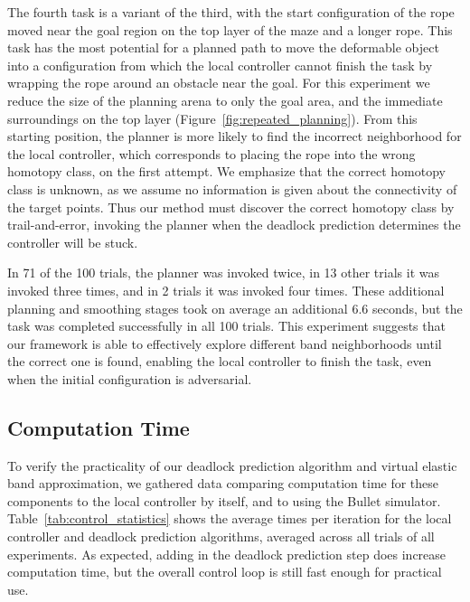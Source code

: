 The fourth task is a variant of the third, with the start configuration of the rope moved near the goal region on the top layer of the maze and a longer rope. This task has the most potential for a planned path to move the deformable object into a configuration from which the local controller cannot finish the task by wrapping the rope around an obstacle near the goal. For this experiment we reduce the size of the planning arena to only the goal area, and the immediate surroundings on the top layer (Figure~\ref{fig:repeated_planning}). From this starting position, the planner is more likely to find the incorrect neighborhood for the local controller, which corresponds to placing the rope into the wrong homotopy class, on the first attempt. We emphasize that the correct homotopy class is unknown, as we assume no information is given about the connectivity of the target points. Thus our method must discover the correct homotopy class by trail-and-error, invoking the planner when the deadlock prediction determines the controller will be stuck.

In 71 of the 100 trials, the planner was invoked twice, in 13 other trials it was invoked three times, and in 2 trials it was invoked four times. These additional planning and smoothing stages took on average an additional 6.6 seconds, but the task was completed successfully in all 100 trials. This experiment suggests that our framework is able to effectively explore different band neighborhoods until the correct one is found, enabling the local controller to finish the task, even when the initial configuration is adversarial.




\subsection{Computation Time}

To verify the practicality of our deadlock prediction algorithm and virtual elastic band approximation, we gathered data comparing computation time for these components to the local controller by itself, and to using the Bullet simulator. Table~\ref{tab:control_statistics} shows the average times per iteration for the local controller and deadlock prediction algorithms, averaged across all trials of all experiments. As expected, adding in the deadlock prediction step does increase computation time, but the overall control loop is still fast enough for practical use.

